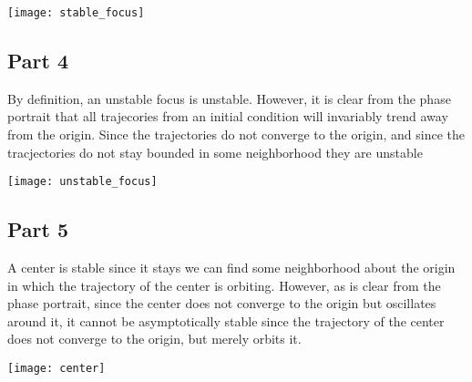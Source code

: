 \begin{center}
  \texttt{[image: stable\_focus]}
\end{center}

\subsection*{Part 4}
By definition, an unstable focus is unstable. However, it is clear from the phase portrait that all trajecories from an initial condition will invariably trend away from the origin. Since the trajectories do not converge to the origin, and since the tracjectories do not stay bounded in some neighborhood they are unstable

\begin{center}
  \texttt{[image: unstable\_focus]}
\end{center}

\subsection*{Part 5}
A center is stable since it stays we can find some neighborhood about the origin in which the trajectory of the center is orbiting. However, as is clear from the phase portrait, since the center does not converge to the origin but oscillates around it, it cannot be asymptotically stable since the trajectory of the center does not converge to the origin, but merely orbits it. 

\begin{center}
  \texttt{[image: center]}
\end{center}
